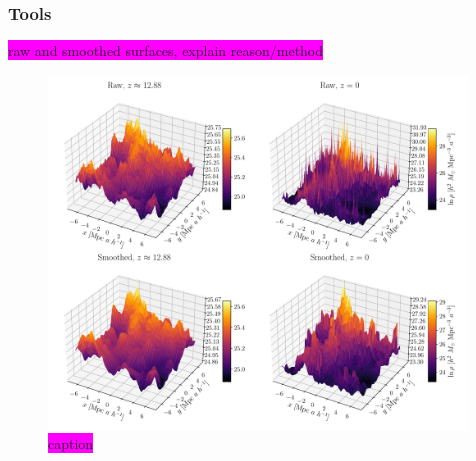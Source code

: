\documentclass[aps,pra,english,notitlepage,reprint,nofootinbib]{revtex4-1}  %
\begin{document}
\subsubsection{Tools}\label{subsubsec:tools}




\colorbox{magenta}{raw and smoothed surfaces, explain reason/method}

\begin{figure}
  \vspace*{-5pt}
  \centering %
  \includegraphics[width=0.99\textwidth]{../figs/density_surf_all.pdf}
  \caption{\colorbox{magenta}{caption}}\label{fig:density surf}
  \vspace*{-5pt}
\end{figure}
\end{document}
